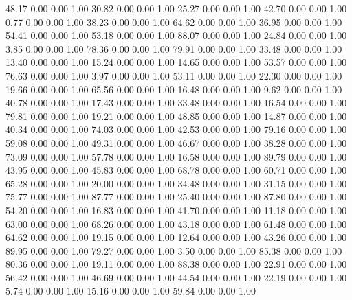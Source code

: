    48.17   0.00   0.00   1.00
   30.82   0.00   0.00   1.00
   25.27   0.00   0.00   1.00
   42.70   0.00   0.00   1.00
    0.77   0.00   0.00   1.00
   38.23   0.00   0.00   1.00
   64.62   0.00   0.00   1.00
   36.95   0.00   0.00   1.00
   54.41   0.00   0.00   1.00
   53.18   0.00   0.00   1.00
   88.07   0.00   0.00   1.00
   24.84   0.00   0.00   1.00
    3.85   0.00   0.00   1.00
   78.36   0.00   0.00   1.00
   79.91   0.00   0.00   1.00
   33.48   0.00   0.00   1.00
   13.40   0.00   0.00   1.00
   15.24   0.00   0.00   1.00
   14.65   0.00   0.00   1.00
   53.57   0.00   0.00   1.00
   76.63   0.00   0.00   1.00
    3.97   0.00   0.00   1.00
   53.11   0.00   0.00   1.00
   22.30   0.00   0.00   1.00
   19.66   0.00   0.00   1.00
   65.56   0.00   0.00   1.00
   16.48   0.00   0.00   1.00
    9.62   0.00   0.00   1.00
   40.78   0.00   0.00   1.00
   17.43   0.00   0.00   1.00
   33.48   0.00   0.00   1.00
   16.54   0.00   0.00   1.00
   79.81   0.00   0.00   1.00
   19.21   0.00   0.00   1.00
   48.85   0.00   0.00   1.00
   14.87   0.00   0.00   1.00
   40.34   0.00   0.00   1.00
   74.03   0.00   0.00   1.00
   42.53   0.00   0.00   1.00
   79.16   0.00   0.00   1.00
   59.08   0.00   0.00   1.00
   49.31   0.00   0.00   1.00
   46.67   0.00   0.00   1.00
   38.28   0.00   0.00   1.00
   73.09   0.00   0.00   1.00
   57.78   0.00   0.00   1.00
   16.58   0.00   0.00   1.00
   89.79   0.00   0.00   1.00
   43.95   0.00   0.00   1.00
   45.83   0.00   0.00   1.00
   68.78   0.00   0.00   1.00
   60.71   0.00   0.00   1.00
   65.28   0.00   0.00   1.00
   20.00   0.00   0.00   1.00
   34.48   0.00   0.00   1.00
   31.15   0.00   0.00   1.00
   75.77   0.00   0.00   1.00
   87.77   0.00   0.00   1.00
   25.40   0.00   0.00   1.00
   87.80   0.00   0.00   1.00
   54.20   0.00   0.00   1.00
   16.83   0.00   0.00   1.00
   41.70   0.00   0.00   1.00
   11.18   0.00   0.00   1.00
   63.00   0.00   0.00   1.00
   68.26   0.00   0.00   1.00
   43.18   0.00   0.00   1.00
   61.48   0.00   0.00   1.00
   64.62   0.00   0.00   1.00
   19.15   0.00   0.00   1.00
   12.64   0.00   0.00   1.00
   43.26   0.00   0.00   1.00
   89.95   0.00   0.00   1.00
   79.27   0.00   0.00   1.00
    3.50   0.00   0.00   1.00
   85.38   0.00   0.00   1.00
   80.36   0.00   0.00   1.00
   19.11   0.00   0.00   1.00
   88.38   0.00   0.00   1.00
   22.91   0.00   0.00   1.00
   56.42   0.00   0.00   1.00
   46.69   0.00   0.00   1.00
   44.54   0.00   0.00   1.00
   22.19   0.00   0.00   1.00
    5.74   0.00   0.00   1.00
   15.16   0.00   0.00   1.00
   59.84   0.00   0.00   1.00

